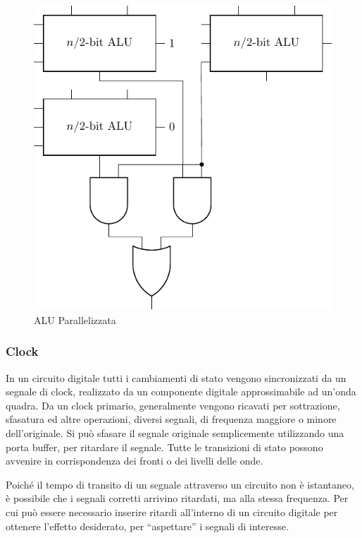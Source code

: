 \documentclass{article}
\numberwithin{equation}{subsection}
\begin{document}
\begin{figure}[H]%
    \centering%
    \includegraphics{alu-n-bit.pdf}%
    \caption{ALU Parallelizzata}%
\end{figure}

\subsubsection{Clock}

In un circuito digitale tutti i cambiamenti di stato vengono sincronizzati da un segnale di clock, realizzato da un componente digitale approssimabile ad un'onda quadra. Da un clock primario, generalmente vengono 
ricavati per sottrazione, sfasatura ed altre operazioni, diversi segnali, di frequenza maggiore o minore dell'originale. Si può sfasare il segnale originale semplicemente utilizzando una 
porta buffer, per ritardare il segnale. Tutte le transizioni di stato possono avvenire in corrispondenza dei fronti o dei livelli delle onde. 

Poiché il tempo di transito di un segnale attraverso un circuito non è istantaneo, è possibile che i segnali corretti arrivino ritardati, ma alla stessa frequenza. Per cui può essere necessario inserire ritardi 
all'interno di un circuito digitale per ottenere l'effetto desiderato, per ``aspettare'' i segnali di interesse. 
\end{document}
